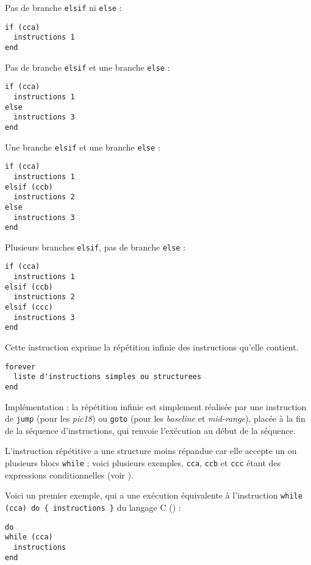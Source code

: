 Pas de branche \texttt{elsif} ni \texttt{else} :
\begin{lstlisting}[language=piccolo]
if (cca)
  instructions 1
end
\end{lstlisting}

Pas de branche \texttt{elsif} et une branche \texttt{else} :
\begin{lstlisting}[language=piccolo]
if (cca)
  instructions 1
else
  instructions 3
end
\end{lstlisting}

Une branche \texttt{elsif} et une branche \texttt{else} :
\begin{lstlisting}[language=piccolo]
if (cca)
  instructions 1
elsif (ccb)
  instructions 2
else
  instructions 3
end
\end{lstlisting}

Plusieurs branches \texttt{elsif}, pas de branche \texttt{else} :
\begin{lstlisting}[language=piccolo]
if (cca)
  instructions 1
elsif (ccb)
  instructions 2
elsif (ccc)
  instructions 3
end
\end{lstlisting}






Cette instruction exprime la répétition infinie des instructions qu'elle contient.
\begin{lstlisting}[language=piccolo]
forever
  liste d'instructions simples ou structurees
end
\end{lstlisting}

Implémentation : la répétition infinie est simplement réalisée par une instruction de \texttt{jump} (pour les \emph{pic18}) ou \texttt{goto} (pour les \emph{baseline} et \emph{mid-range}), placée à la fin de la séquence d'instructions, qui renvoie l'exécution au début de la séquence.










L'instruction répétitive a une structure moins répandue car elle accepte un ou plusieurs blocs \texttt{while} ; voici plusieurs exemples, \texttt{cca}, \texttt{ccb} et \texttt{ccc} étant des expressions conditionnelles (voir ).


Voici un premier exemple, qui a une exécution équivalente à l'instruction \texttt{while (cca) do \{ instructions \}} du langage C () :
\begin{lstlisting}[language=piccolo]
do
while (cca)
  instructions
end
\end{lstlisting}

